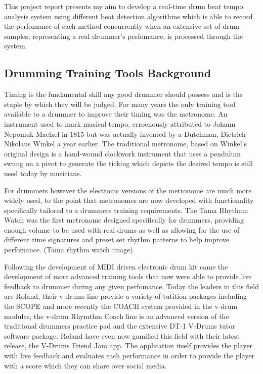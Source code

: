 \documentclass[a4paper, 11pt]{article}
\begin{document}
This project report presents my aim to develop a real-time drum beat tempo analysis system using different beat detection algorithms which is able to record the perfomance of each method concurrently when an extensive set of drum samples, representing a real drummer's perfomance, is processed through the system.

\maketitle{} \subsection{Drumming Training Tools Background}
Timing is the fundamental skill any good drummer should possess and is the staple by which they will be judged. For many years the only training tool available to a drummer to improve their timing was the metronome. An instrument used to mark musical tempo, erroenously attributed to Johann Nepomuk Maelzel in 1815 but was actually invented by a Dutchman, Dietrich Nikolaus Winkel a year earlier. The traditional metronome, based on Winkel's original design is a hand-wound clockwork instrument that uses a pendulum swung on a pivot to generate the ticking which depicts the desired tempo \cite{brit-metro} is still used today by musicians. 

For drummers however the electronic versions of the metronome are much more widely used, to the point that metronomes are now developed with functionality specifically tailored to a drummers training requirements. The Tama Rhytham Watch was the first metronome designed specifically for drummers, providing enough volume to be used with real drums as well as allowing for the use of different time signatures and preset set rhythm patterns to help improve perfomance. (Tama rhythm watch image) 

Following the development of MIDI driven electronic drum kit came the development of more advanced training tools that now were able to provide live feedback to drummer during any given perfomance. Today the leaders in this field are Roland, their v-drums line provide a variety of tutition packages including the SCOPE and more recently the COACH system provided in the v-drum modules, the v-drum Rhymthm Coach line is an advanced version of the traditional drummers practice pad and the extensive DT-1 V-Drums tutor software package. Roland have even now gamified this field with their latest release, the V-Drums Friend Jam app. The application itself provides the player with live feedback and evaluates each performance in order to provide the player with a score which they can share over social media.
\end{document}
